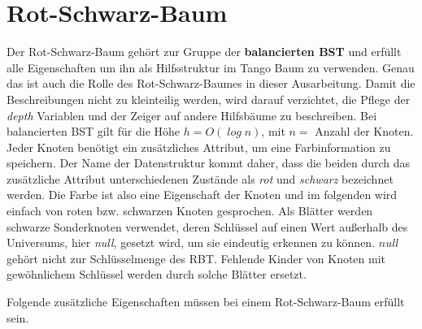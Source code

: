 \documentclass[a4paper,12pt]{article}
\begin{document}
\section{Rot-Schwarz-Baum}
Der Rot-Schwarz-Baum gehört zur Gruppe der \textbf{balancierten BST} und erfüllt alle Eigenschaften um ihn als Hilfsstruktur im Tango Baum zu verwenden. Genau das ist auch die Rolle des Rot-Schwarz-Baumes in dieser Ausarbeitung. Damit die Beschreibungen nicht zu kleinteilig werden, wird darauf verzichtet, die Pflege der \textit{depth} Variablen und der Zeiger auf andere Hilfsbäume zu beschreiben. Bei balancierten BST gilt für die Höhe $h = \mathit{O(\log n)}$, mit $n =$ Anzahl der Knoten. Jeder Knoten benötigt ein zusätzliches Attribut, um eine Farbinformation zu speichern. Der Name der Datenstruktur kommt daher, dass die beiden durch das zusätzliche Attribut unterschiedenen Zustände als \textit{rot} und \textit{schwarz} bezeichnet werden. Die Farbe ist also eine Eigenschaft der Knoten und im folgenden wird einfach von roten bzw. schwarzen Knoten gesprochen. Als Blätter werden schwarze Sonderknoten verwendet, deren Schlüssel auf einen Wert außerhalb des Universums, hier \textit{null}, gesetzt wird, um sie eindeutig erkennen zu können. $\mathit{null}$ gehört nicht zur Schlüsselmenge des RBT. Fehlende Kinder von Knoten mit gewöhnlichem Schlüssel werden durch solche Blätter ersetzt.  

\noindent Folgende zusätzliche Eigenschaften müssen bei einem Rot-Schwarz-Baum erfüllt sein. 
\end{document}
